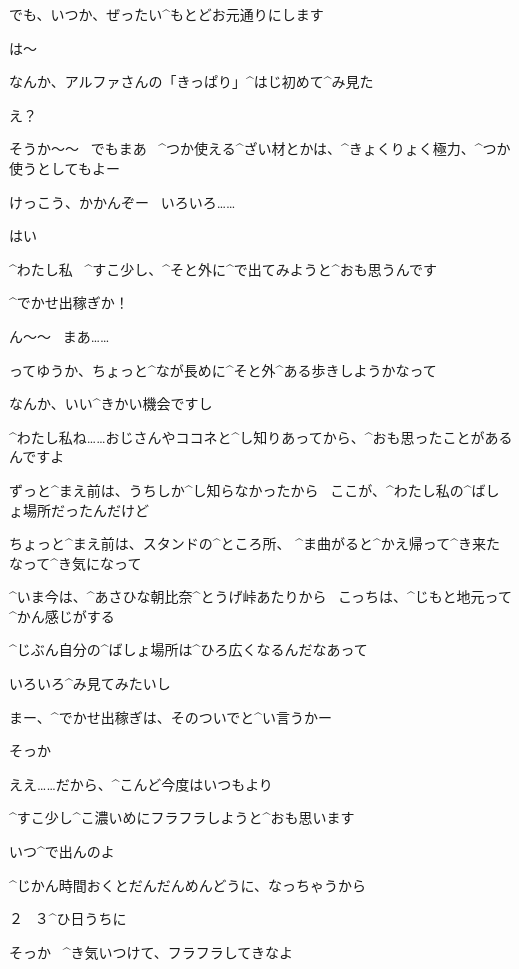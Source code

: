 \Alpha でも、いつか、ぜったい^{もとどお}{元通}りにします

\page
\Ojisan は〜

\Ojisan なんか、アルファさんの「きっぱり」^{はじ}{初}めて^{み}{見}た

\Alpha え？

\Ojisan そうか〜〜
\ でもまあ
\ ^{つか}{使}える^{ざい}{材}とかは、^{きょくりょく}{極力}、^{つか}{使}うとしてもよー

\Ojisan けっこう、かかんぞー
\ いろいろ……

\Alpha はい

\page
\Alpha ^{わたし}{私}
\ ^{すこ}{少}し、^{そと}{外}に^{で}{出}てみようと^{おも}{思}うんです

\Ojisan ^{でかせ}{出稼}ぎか！

\Alpha ん〜〜
\ まあ……

\Alpha ってゆうか、ちょっと^{なが}{長}めに^{そと}{外}^{ある}{歩}きしようかなって

\page
\Alpha なんか、いい^{きかい}{機会}ですし

\Alpha ^{わたし}{私}ね……おじさんやココネと^{し}{知}りあってから、^{おも}{思}ったことがあるんですよ

\Alpha ずっと^{まえ}{前}は、うちしか^{し}{知}らなかったから
\ ここが、^{わたし}{私}の^{ばしょ}{場所}だったんだけど

\Alpha ちょっと^{まえ}{前}は、スタンドの^{ところ}{所}、
^{ま}{曲}がると^{かえ}{帰}って^{き}{来}たなって^{き}{気}になって

\Alpha ^{いま}{今}は、^{あさひな}{朝比奈}^{とうげ}{峠}あたりから
\ こっちは、^{じもと}{地元}って^{かん}{感}じがする

\page
\Alpha ^{じぶん}{自分}の^{ばしょ}{場所}は^{ひろ}{広}くなるんだなあって

\Alpha いろいろ^{み}{見}てみたいし

\Alpha まー、^{でかせ}{出稼}ぎは、そのついでと^{い}{言}うかー

\Ojisan そっか

\Alpha ええ……だから、^{こんど}{今度}はいつもより

\Alpha ^{すこ}{少}し^{こ}{濃}いめにフラフラしようと^{おも}{思}います

\page
\Ojisan いつ^{で}{出}んのよ

\Alpha ^{じかん}{時間}おくとだんだんめんどうに、なっちゃうから

\Alpha ２
\ ３^{ひ}{日}うちに

\Ojisan そっか
\ ^{き}{気}いつけて、フラフラしてきなよ

